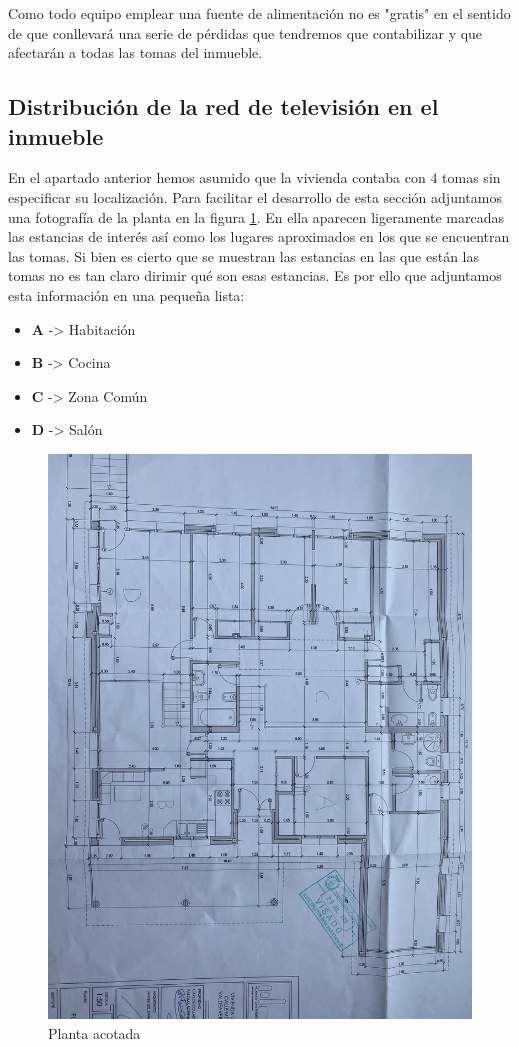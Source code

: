 \documentclass{article}[12 pt]
\begin{document}
			Como todo equipo emplear una fuente de alimentación no es "gratis" en el sentido de que conllevará una serie de pérdidas que tendremos que contabilizar y que afectarán a todas las tomas del inmueble.\\

		\subsection{Distribución de la red de televisión en el inmueble}
			En el apartado anterior hemos asumido que la vivienda contaba con $4$ tomas sin especificar su localización. Para facilitar el desarrollo de esta sección adjuntamos una fotografía de la planta en la figura \ref{f:p_acotada}. En ella aparecen ligeramente marcadas las estancias de interés así como los lugares aproximados en los que se encuentran las tomas. Si bien es cierto que se muestran las estancias en las que están las tomas no es tan claro dirimir qué son esas estancias. Es por ello que adjuntamos esta información en una pequeña lista:

			\begin{itemize}
				\item \textbf{A} -> Habitación
				\item \textbf{B} -> Cocina
				\item \textbf{C} -> Zona Común
				\item \textbf{D} -> Salón
			\end{itemize}

			\begin{figure}
				\centering
				\includegraphics[width=0.8\linewidth]{planta_acotada.jpg}
				\caption{Planta acotada}
				\label{f:p_acotada}
			\end{figure}
\end{document}
